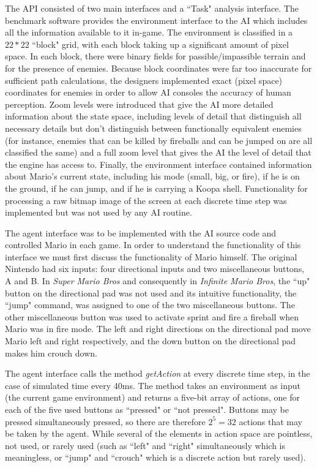 \documentclass[12pt]{article}
\begin{document}
\begin{multicols}{2}
The API consisted of two main interfaces and a ``Task" analysis interface. The benchmark software provides the environment interface 
to the AI which includes all the information available to it in-game. The environment is classified in a $22 * 22$ ``block" grid, with each block 
taking up a significant amount of pixel space. In each block, there were binary fields for passible/impassible terrain and for the presence of enemies. 
Because block coordinates were far too inaccurate for sufficient path calculations, the designers implemented exact (pixel space) coordinates for 
enemies in order to allow AI consoles the accuracy of human perception. Zoom levels were introduced that give the AI more detailed information about the 
state space, including levels of detail that distinguish all necessary details but don't distinguish between functionally equivalent enemies (for instance, enemies that 
can be killed by fireballs and can be jumped on are all classified the same) and a full zoom level that gives the AI the level of detail that the engine has access to.
Finally, the environment interface contained information about Mario's current state, including his mode (small, big, or fire), if he is on the ground, if he can jump, 
and if he is carrying a Koopa shell. Functionality for processing a raw bitmap image of the screen at each discrete time step was implemented but was not used by any AI routine.

The agent interface was to be implemented with the AI source code and controlled Mario in each game. In order to understand the functionality of this interface we 
must first discuss the functionality of Mario himself. The original Nintendo had six inputs: four directional inputs and two miscellaneous buttons, A and B. 
In \textit{Super Mario Bros} and consequently in \textit{Infinite Mario Bros}, the ``up" button on the directional pad was not used and its intuitive functionality, 
the ``jump" command, was assigned to one of the two miscellaneous buttons. The other miscellaneous button was used to activate sprint and fire a fireball 
when Mario was in fire mode. The left and right directions on the directional pad move Mario left and right respectively, and the down button on the directional 
pad makes him crouch down. 

The agent interface calls the method \textit{getAction} at every discrete time step, in the case of simulated time every 40ms. 
The method takes an environment as input (the current game environment) and returns a  five-bit array of actions, one for each of the 
five used buttons as ``pressed" or ``not pressed". Buttons may be pressed simultaneously pressed, so there are therefore \(2^5 = 32\) 
actions that may be taken by the agent. While several of the elements in action space are pointless, not used, or rarely used (such as 
``left" and ``right" simultaneously which is meaningless, or ``jump" and ``crouch" which is a discrete action but rarely used). 


\end{multicols}
\end{document}
